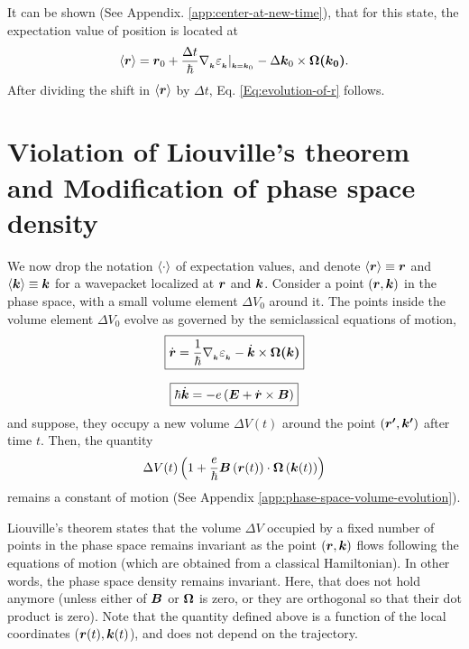 \documentclass{report}
\renewcommand\vec[1]{\ensuremath\boldsymbol{#1}} %
\begin{document}
It can be shown (See Appendix. \ref{app:center-at-new-time}), that for this state, the expectation value of position is located at
$$\langle \vec{r} \rangle = \vec{r}_0 +  \frac{\Delta t}{\hbar} \nabla{_{_{\vec{k}}}} \varepsilon_{_{\vec{k}}}|_{_{\vec{k} = \vec{k}_0}} - \Delta \vec{k}_0 \times \vec{\Omega(\vec{k}_0)}.$$
After dividing the shift in $\langle{\vec{r}}\rangle$ by $\Delta t$, Eq. \eqref{Eq:evolution-of-r} follows.
\section{Violation of Liouville's theorem and Modification of phase space density}
We now drop the notation $\expval{\cdot}$ of expectation values, and denote $\expval{\vec{r}} \equiv \vec{r}$ and $\expval{\vec{k}} \equiv \vec{k}$ for a wavepacket localized at $\vec{r}$ and $\vec{k}$. Consider a point $\left(\vec{r},\vec{k}\right)$ in the phase space, with a small volume element $\Delta V_0$ around it. The points inside the volume element $\Delta V_0$ evolve as governed by the semiclassical equations of motion,
\begin{equation}\label{Eq:evolution-of-R}
	\boxed{\dot{\vec{r}} = \frac{1}{\hbar} \nabla{_{_{\vec{k}}}} \varepsilon_{_{\vec{k}}} - \dot{\vec{k}} \times \vec{\Omega(\vec{k})}}
\end{equation}

\begin{equation}\label{Eq:evolution-of-K}
	\boxed{\hbar \dot{\vec{k}} = -e\left(\vec{E} + \dot{\vec{r}} \times \vec{B} \right)}
\end{equation}
and suppose, they occupy a new volume $\Delta V(t)$ around the point $\left(\vec{r'},\vec{k'}\right)$ after time $t$. Then, the quantity $$\Delta V(t) \left(1 + \frac{e}{\hbar} \vec{B}\left(\vec{r}(t)\right) \cdot  \vec{\Omega}\left(\vec{k}(t)\right)\right)$$ remains a constant of motion (See Appendix \ref{app:phase-space-volume-evolution}).

Liouville's theorem states that the volume $\Delta V$ occupied by a fixed number of points in the phase space remains invariant as the point $\left(\vec{r},\vec{k}\right)$ flows following the equations of motion (which are obtained from a classical Hamiltonian). In other words, the phase space density remains invariant. Here, that does not hold anymore (unless either of $\vec{B}$ or $\vec{\Omega}$ is zero, or they are orthogonal so that their dot product is zero). Note that the quantity defined above is a function of the local coordinates ($\vec{r}(t), \vec{k}(t)$), and does not depend on the trajectory.
\end{document}
